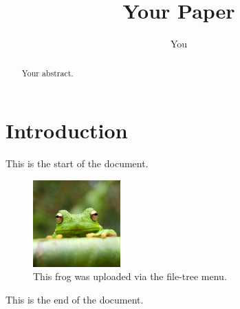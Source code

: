 \documentclass{article}
\title{Your Paper}
\author{You}
\begin{document}
\maketitle

\begin{abstract}
Your abstract.
\end{abstract}

\section{Introduction}

This is the start of the document.

\begin{figure}[h]
  \centering
  \includegraphics[width=0.3\textwidth]{frog.jpg}
  \caption{\label{fig:frog}This frog was uploaded via the file-tree menu.}
\end{figure}

This is the end of the document.
\end{document}
